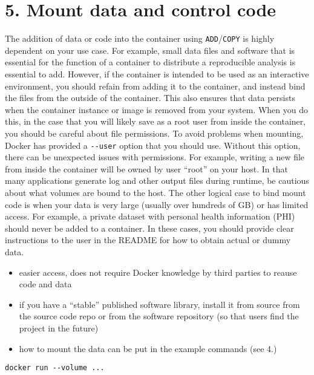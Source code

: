 \documentclass[10pt,letterpaper]{article}
\providecommand{\tightlist}{%
  \setlength{\itemsep}{0pt}\setlength{\parskip}{0pt}}
\begin{document}
\hypertarget{mount-data-and-control-code}{%
\section*{5. Mount data and control
code}\label{mount-data-and-control-code}}

The addition of data or code into the container using
\texttt{ADD}/\texttt{COPY} is highly dependent on your use case. For
example, small data files and software that is essential for the
function of a container to distribute a reproducible analysis is
essential to add. However, if the container is intended to be used as an
interactive environment, you should refain from adding it to the
container, and instead bind the files from the outside of the container.
This also ensures that data persists when the container instance or
image is removed from your system. When you do this, in the case that
you will likely save as a root user from inside the container, you
should be careful about file permissions. To avoid problems when
mounting, Docker has provided a \texttt{-\/-user} option that you should
use. Without this option, there can be unexpected issues with
permissions. For example, writing a new file from inside the container
will be owned by user ``root'' on your host. In that many applications
generate log and other output files during runtime, be cautious about
what volumes are bound to the host. The other logical case to bind mount
code is when your data is very large (usually over hundreds of GB) or
has limited access. For example, a private dataset with personal health
information (PHI) should never be added to a container. In these cases,
you should provide clear instructions to the user in the README for how
to obtain actual or dummy data.

\begin{itemize}
\tightlist
\item
  easier access, does not require Docker knowledge by third parties to
  reause code and data
\item
  if you have a ``stable'' published software library, install it from
  source from the source code repo or from the software repository (so
  that users find the project in the future)
\item
  how to mount the data can be put in the example commands (see 4.)
\end{itemize}

\begin{verbatim}
docker run --volume ...
\end{verbatim}
\end{document}

